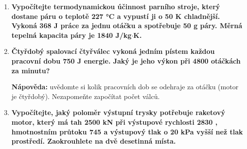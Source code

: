 \documentclass[../main.tex]{subfiles}
\begin{document}
\begin{enumerate}[label={\textbf{\arabic*.}}, resume]

    \item \textbf{Vypočítejte termodynamickou účinnost parního stroje, který dostane páru o teplotě 227 °C a vypustí ji o 50 K chladnější. Vykoná 368 J práce za jednu otáčku a spotřebuje 50 g páry. Měrná tepelná kapacita páry je 1840 J/kg\(\cdot\)K.}\vspace{5.5cm}
    \dotfill
    
    \item \textbf{Čtyřdobý spalovací čtyřválec vykoná jedním pístem každou pracovní dobu 750 J energie. Jaký je jeho výkon při 4800 otáčkách za minutu?}\\
    \vspace{5.5cm}
    \dotfill\odst
    \begin{minipage}{0.7\textwidth}
        \small{\textbf{Nápověda: }uvědomte si kolik pracovních dob se odehraje za otáčku (motor je čtyřdobý). Nezapomeňte započítat počet válců.}
    \end{minipage}
    \hfill
    \begin{minipage}{0.25\textwidth}
    \end{minipage}

    \item \textbf{Vypočítejte, jaký poloměr výstupní trysky potřebuje raketový motor, který má tah 2500 kN při výstupové rychlosti 2830 \ms, hmotnostním průtoku 745 \kgs a výstupový tlak o 20 kPa vyšší než tlak prostředí. Zaokrouhlete na dvě desetinná místa.}\vspace{5.5cm}
    \dotfill
    
\end{enumerate}
\end{document}
